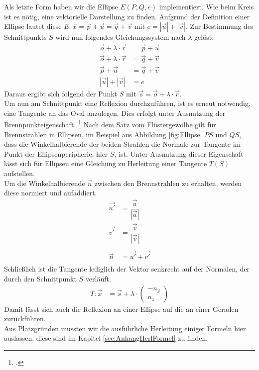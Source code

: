 \documentclass[reducespace,stylepage,semiarbeit]{spezidoc}
\begin{document}
Als letzte Form haben wir die Ellipse $E(P, Q, e)$ implementiert.
Wie beim Kreis ist es nötig, eine vektorielle Darstellung zu finden. 
Aufgrund der Definition einer Ellipse lautet diese $E: \vec{x} = \vec{p} + \vec{u} = \vec{q} + \vec{v}$ mit $ e = |\vec{u}| + |\vec{v}|$.
Zur Bestimmung des Schnittpunkts $S$ wird nun folgendes Gleichungssystem nach $\lambda$ gelöst:
\begin{equation*}
\begin{split}
\vec{o} + \lambda \cdot \vec{r} &= \vec{p} + \vec{u} \\
\vec{o} + \lambda \cdot \vec{r} &= \vec{q} + \vec{v} \\
\vec{p} + \vec{u} &= \vec{q} + \vec{v} \\
|\vec{u}| + |\vec{v}| &= e
\end{split}
\end{equation*}
Daraus ergibt sich folgend der Punkt $S$ mit $\vec{s} = \vec{o} + \lambda \cdot \vec{r}$.\\
Um nun am Schnittpunkt eine Reflexion durchzuführen, ist es erneut notwendig, eine Tangente an das Oval anzulegen. 
Dies erfolgt unter Ausnutzung der Brennpunkteigenschaft. \footcite{beweis-ellipse}
Nach dem Satz vom Flüstergewölbe gilt für Brennstrahlen in Ellipsen, im Beispiel aus Abbildung \ref{fig:Ellipse} $\overline{PS}$ und $\overline{QS}$, dass die Winkelhalbierende der beiden Strahlen die Normale zur Tangente im Punkt der Ellipsenperipherie, hier $S$, ist.
Unter Ausnutzung dieser Eigenschaft lässt sich für Ellipsen eine Gleichung zu Herleitung einer Tangente $T(S)$ aufstellen.\\
Um die Winkelhalbierende $\vec{n}$ zwischen den Brennstrahlen zu erhalten, werden diese normiert und aufaddiert.
\begin{equation*}
\begin{split}
\vec{u'} & = \dfrac{\vec{u}}{|\vec{u}|} \\
\vec{v'}  &= \dfrac{\vec{v}}{|\vec{v}|} \\ \\
\vec{n} & = \vec{u'} + \vec{v'} \\ 
\end{split}
\end{equation*}
Schließlich ist die Tangente lediglich der Vektor senkrecht auf der Normalen, der durch den Schnittpunkt $S$ verläuft.
\begin{equation*}
\begin{split}
T: \vec{x} & = \vec{s} + \lambda \cdot \begin{pmatrix} -n_y \\ n_x \end{pmatrix}
\end{split}
\end{equation*}
Damit lässt sich auch die Reflexion an einer Ellipse auf die an einer Geraden zurückführen.\\
Aus Platzgründen mussten wir die ausführliche Herleitung einiger Formeln hier auslassen, diese sind im Kapitel \ref{sec:AnhangHerlFormel} zu finden.
\end{document}
